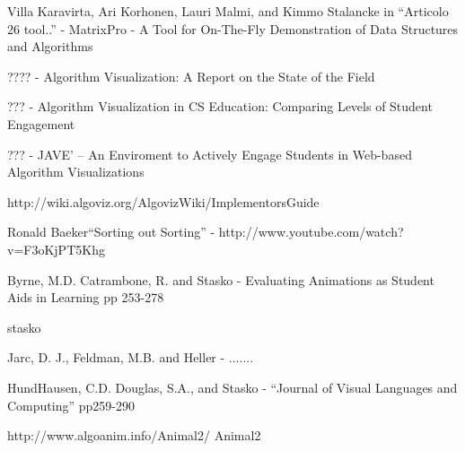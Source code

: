 \begin{thebibliography}{11}
Villa Karavirta, Ari Korhonen, Lauri Malmi, and Kimmo
Stalancke in {}``Articolo 26 tool..'' - MatrixPro - A Tool for On-The-Fly
Demonstration of Data Structures and Algorithms

???? - Algorithm Visualization: A Report on the State
of the Field

 ??? - Algorithm Visualization in CS Education: Comparing
Levels of Student Engagement

 ??? - JAVE' -- An Enviroment to Actively Engage Students
in Web-based Algorithm Visualizations

 http://wiki.algoviz.org/AlgovizWiki/ImplementorsGuide

 Ronald Baeker{}``Sorting out Sorting'' - http://www.youtube.com/watch?v=F3oKjPT5Khg 

 Byrne, M.D. Catrambone, R. and Stasko - Evaluating
Animations as Student Aids in Learning pp 253-278

 stasko 

 Jarc, D. J., Feldman, M.B. and Heller - .......

 HundHausen, C.D. Douglas, S.A., and Stasko - {}``Journal
of Visual Languages and Computing'' pp259-290

 http://www.algoanim.info/Animal2/ Animal2
\end{thebibliography}